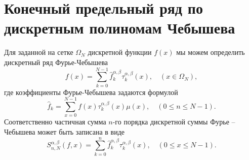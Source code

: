 %
%
%






\section{Конечный предельный ряд по дискретным полиномам Чебышева}


Для заданной на сетке $\Omega_N$ дискретной функции $f(x)$ мы можем определить дискретный ряд Фурье-Чебышева
\begin{equation}
\label{sms2eq1}
f(x)=\sum\limits_{k=0}^{N-1}\hat{f}^{\alpha,\beta}_k\tau_{k}^{\alpha,\beta}(x),\quad (x \in \Omega_N),
\end{equation}
где коэффициенты Фурье-Чебышева задаются формулой
\begin{equation}
\label{sms2eq2}
\hat{f}_k = \sum\limits_{x=0}^{N-1}f(x)\tau_{k}^{\alpha,\beta}(x)\mu(x),\quad (0\le n\le N-1).
\end{equation}
Соответственно частичная сумма $n$-го порядка дискретной суммы Фурье -- Чебышева может быть записана в виде
\begin{equation}
\label{sms2eq5}
S_{n,N}^{\alpha,\beta}(f,x) = \sum\limits_{k=0}^{n}\hat{f}^{\alpha,\beta}_k \tau_{k}^{\alpha,\beta}(x),\quad (0\le x\le N-1).
\end{equation}

